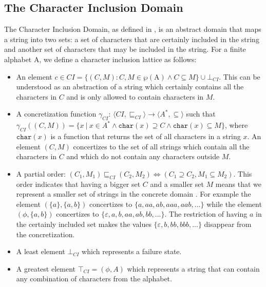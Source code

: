 \documentclass[10pt]{report}
\begin{document}
\subsection{The Character Inclusion Domain} \label{character}
The Character Inclusion Domain, as defined in \cite{character}, is an abstract domain that maps a string into two sets: a set of characters that are certainly included in the string and another set of characters that may be included in the string. 
For a finite alphabet $\mathrm{A}$, we define a character inclusion lattice as follows: 
\begin{itemize}
	\item An element $c \in CI = \lbrace(C, M): C, M \in \wp (\mathrm{A}) \land C \subseteq M \rbrace \cup \bot_{CI}$. This can be understood as an abstraction of a string which certainly contains all the characters in $C$ and is only allowed to contain characters in $ M $.
	
	\item A concretization function $\gamma_{CI}$: $\langle CI, \sqsubseteq_{CI}\rangle  \longrightarrow \langle A^{*}, \subseteq\rangle$ such that \\ $ \gamma_{CI}((C, M)) = \lbrace x\ \vert\ x \in A^{*} \wedge \mathtt{char}(x) \supseteq C \wedge \mathtt{char}(x) \subseteq M \rbrace $, where $ \mathtt{char}(x) $ is a function that returns the set of all characters in a string  $ x $.  An element $ (C, M) $ concertizes to the set of all strings which contain all the characters in $ C $ and which do not contain any characters outside $ M $. 
	
	\item A partial order: $(C_{1}, M_{1}) \sqsubseteq_{CI} (C_{2}, M_{2}) \iff (C_{1} \supseteq C_{2}, M_{1} \subseteq M_{2})$. This order indicates that having a bigger set $ C $ and a smaller set $ M $ means that we represent a smaller set of strings in the concrete domain . For example the element $(\lbrace a \rbrace , \lbrace a,b \rbrace)$ concertizes to $\lbrace a, aa, ab, aaa, aab,... \rbrace$ while the element $(\phi, \lbrace a, b \rbrace)$ concertizes to $\lbrace\varepsilon, a, b, aa, ab, bb,...\rbrace$. The restriction of having $a$ in the certainly included set makes the values $\lbrace \varepsilon, b, bb, bbb,...\rbrace $ disappear from the concretization. 
	
	\item A least element $\bot_{CI}$ which represents a failure state. 
	\item A greatest element $\top_{CI} = (\phi, A) $ which represents a string that can contain any combination of characters from the alphabet. 
	

\end{itemize}
\end{document}
